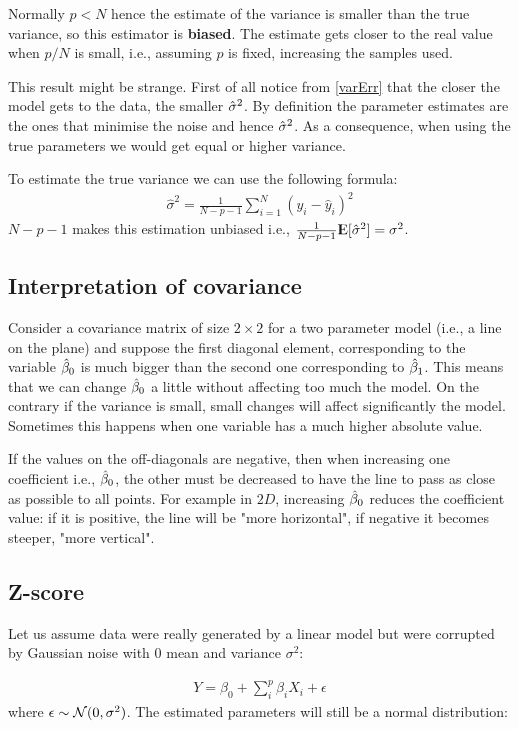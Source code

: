Normally $p<N$ hence the estimate of the variance is smaller than the true variance, so this estimator is \textbf{biased}. The estimate gets closer to the real value when $p/N$ is small, i.e., assuming $p$ is fixed, increasing the samples used. 

This result might be strange. First of all notice from \autoref{varErr} that the closer the model gets to the data, the smaller $\hat{\sigma}^2$. By definition the parameter estimates are the ones that minimise the noise and hence $\hat{\sigma}^2$. As a consequence, when using the true parameters we would get equal or higher variance.

To estimate the true variance we can use the following formula:
\begin{align}
\hat{\sigma}^2 = \frac{1}{N-p-1}\sum_{i=1}^{N}(y_i-\hat{y}_i)^2
\end{align}
$N-p-1$ makes this estimation unbiased i.e., $\frac{1}{N-p-1}{\rm I\kern-.3em E}[\hat{\sigma}^2] =\sigma^2$.

\subsection{Interpretation of covariance}
Consider a covariance matrix of size $2\times 2$ for a two parameter model (i.e., a line on the plane) and suppose the first diagonal element, corresponding to the variable $\mathrm{\hat{\mathbf{\beta}}}_0$ is much bigger than the second one corresponding to $\mathrm{\hat{\mathbf{\beta}}}_1$. This means that we can change $\mathrm{\hat{\mathbf{\beta}}}_0$ a little without affecting too much the model. On the contrary if the variance is small, small changes will affect significantly the model. Sometimes this happens when one variable has a much higher absolute value.

If the values on the off-diagonals are negative, then when increasing one coefficient i.e., $\mathrm{\hat{\mathbf{\beta}}}_0$, the other must be decreased to have the line to pass as close as possible to all points. For example in $2D$, increasing $\mathrm{\hat{\mathbf{\beta}}}_0$ reduces the coefficient value: if it is positive, the line will be "more horizontal", if negative it becomes steeper, "more vertical".
\subsection{Z-score}
Let us assume data were really generated by a linear model but were corrupted by Gaussian noise with $0$ mean and variance $\sigma^2$:

\begin{align}
Y = \beta_0 +\sum_i^p \beta_i X_i + \epsilon
\end{align} 
where $\epsilon \sim \CMcal{N}(0,\sigma^2)$.
The estimated parameters will still be a normal distribution:

